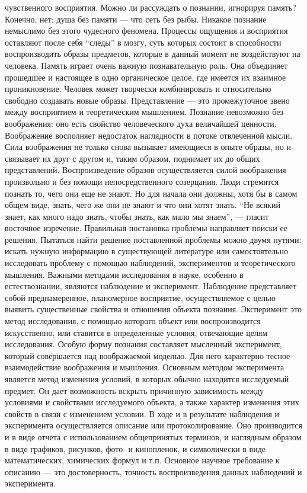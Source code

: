\documentclass[12pt]{article}
\begin{document}
чувственного восприятия.
Можно ли рассуждать о познании, игнорируя память? Конечно, нет: душа без памяти --- что сеть без рыбы.
Никакое познание немыслимо без этого чудесного феномена. Процессы ощущения и восприятия оставляют
после себя “следы” в мозгу, суть которых состоит в способности воспроизводить образы предметов, которые в
данный  момент  не  воздействуют  на  человека.  Память  играет  очень  важную  познавательную  роль.  Она
объединяет прошедшее и настоящее в одно органическое целое, где имеется их взаимное проникновение.
Человек может творчески комбинировать и относительно свободно создавать новые образы. Представление --- это  промежуточное  звено  между  восприятием  и  теоретическим  мышлением.  Познание  невозможно  без
воображения:  оно  есть  свойство  человеческого  духа  величайшей  ценности.  Воображение  восполняет
недостаток наглядности в потоке отвлеченной мысли. Сила воображения не только снова вызывает имеющиеся
в опыте образы, но и связывает их друг с другом и, таким образом, поднимает их до общих представлений.
Воспроизведение образов осуществляется силой воображения произвольно и без помощи непосредственного
созерцания.
Люди стремятся познать то, чего они еще не знают. Но для начала они должны, хотя бы в самом общем виде,
знать, чего же они не знают и что они хотят знать. “Не всякий знает, как много надо знать, чтобы знать, как мало
мы знаем”, --- гласит восточное изречение.
Правильная  постановка  проблемы  направляет  поиски  ее  решения.  Пытаться  найти  решение  поставленной
проблемы можно двумя путями: искать нужную информацию в существующей литературе или самостоятельно
исследовать проблему с помощью наблюдений, экспериментов и теоретического мышления.
Важными методами исследования в науке, особенно в естествознании, являются наблюдение и эксперимент.
Наблюдение представляет собой преднамеренное, планомерное восприятие, осуществляемое с целью выявить
существенные свойства  и отношения  объекта  познания.  Эксперимент  это  метод  исследования, с  помощью
которого объект или воспроизводится искусственно, или ставится в определенные условия, отвечающие целям
исследования.  Особую  форму  познания  составляет  мысленный  эксперимент,  который  совершается  над
воображаемой моделью. Для него характерно тесное взаимодействие воображения и мышления. Основным
методом эксперимента является метод изменения условий, в которых обычно находится исследуемый предмет.
Он дает возможность вскрыть причинную зависимость между условиями и свойствами исследуемого объекта, а
также характер изменения этих свойств в связи с изменением условии.
В  ходе  и  в  результате  наблюдения  и  эксперимента  осуществляется  описание  или  протоколирование.  Оно
производится  и  в  виде  отчета  с  использованием  общепринятых  терминов,  и  наглядным  образом  в  виде
графиков, рисунков, фото- и кинопленок, и символически в виде математических, химических формул и т.п.
Основное научное требование к описанию --- это достоверность, точность воспроизведения данных наблюдений
и эксперимента. 
\end{document}
